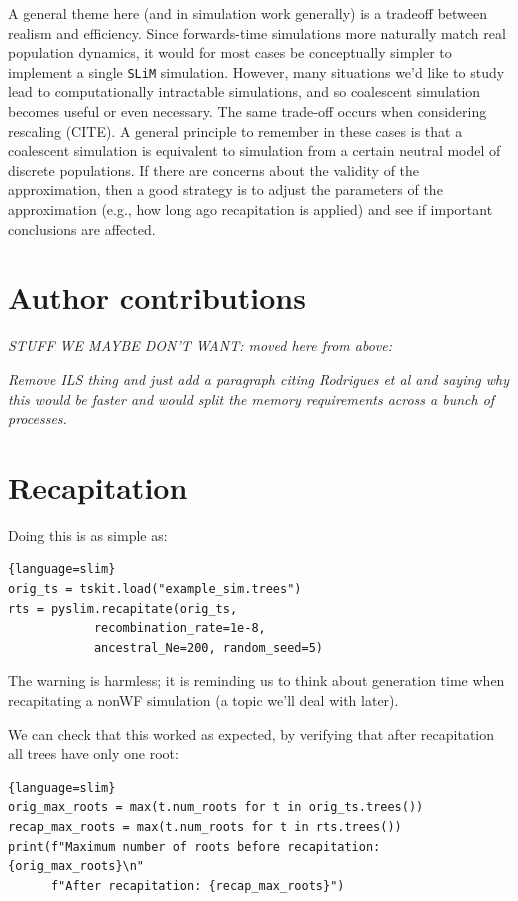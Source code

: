 \documentclass[12pt]{article}
\newcommand{\slim}[0]{\texttt{SLiM}\xspace}
\newcommand{\comment}[1]{\textit{\color{green} #1}}
\begin{document}
A general theme here (and in simulation work generally)
is a tradeoff between realism and efficiency.
Since forwards-time simulations more naturally match real population dynamics,
it would for most cases be conceptually simpler to implement a single \slim simulation.
However, many situations we'd like to study lead to computationally intractable simulations,
and so coalescent simulation becomes useful or even necessary.
The same trade-off occurs when considering rescaling (CITE).
A general principle to remember in these cases is that a coalescent simulation is equivalent
to simulation from a certain neutral model of discrete populations.
If there are concerns about the validity of the approximation,
then a good strategy is to adjust the parameters of the approximation (e.g., how long ago recapitation is applied)
and see if important conclusions are affected.


\section*{Author contributions}




\newpage
\appendix

\comment{STUFF WE MAYBE DON'T WANT: moved here from above:}

\comment{Remove ILS thing and just add a paragraph citing Rodrigues et al and saying why this would be faster and would split the memory requirements across a bunch of processes.}

\section{Recapitation}


Doing this is as simple as:

\begin{lstlisting}{language=slim}
orig_ts = tskit.load("example_sim.trees")
rts = pyslim.recapitate(orig_ts,
            recombination_rate=1e-8,
            ancestral_Ne=200, random_seed=5)
\end{lstlisting}
The warning is harmless; it is reminding us to think about generation time
when recapitating a nonWF simulation (a topic we'll deal with later).

We can check that this worked as expected, by verifying that after recapitation
all trees have only one root:
\begin{lstlisting}{language=slim}
orig_max_roots = max(t.num_roots for t in orig_ts.trees())
recap_max_roots = max(t.num_roots for t in rts.trees())
print(f"Maximum number of roots before recapitation: {orig_max_roots}\n"
      f"After recapitation: {recap_max_roots}")
\end{lstlisting}
\end{document}
